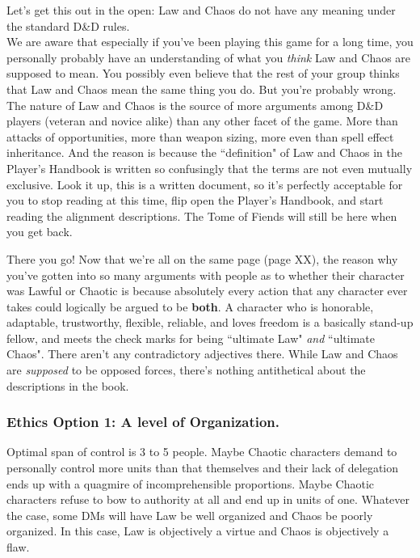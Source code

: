 Let's get this out in the open: Law and Chaos do not have any meaning under the standard D\&D rules.\\

We are aware that especially if you've been playing this game for a long time, you personally probably have an understanding of what you \textit{think} Law and Chaos are supposed to mean. You possibly even believe that the rest of your group thinks that Law and Chaos mean the same thing you do. But you're probably wrong. The nature of Law and Chaos is the source of more arguments among D\&D players (veteran and novice alike) than any other facet of the game. More than attacks of opportunities, more than weapon sizing, more even than spell effect inheritance. And the reason is because the ``definition" of Law and Chaos in the Player's Handbook is written so confusingly that the terms are not even mutually exclusive. Look it up, this is a written document, so it's perfectly acceptable for you to stop reading at this time, flip open the Player's Handbook, and start reading the alignment descriptions. The Tome of Fiends will still be here when you get back.

There you go! Now that we're all on the same page (page XX), the reason why you've gotten into so many arguments with people as to whether their character was Lawful or Chaotic is because absolutely every action that any character ever takes could logically be argued to be \textbf{both}. A character who is honorable, adaptable, trustworthy, flexible, reliable, and loves freedom is a basically stand-up fellow, and meets the check marks for being ``ultimate Law" \textit{and} ``ultimate Chaos". There aren't any contradictory adjectives there. While Law and Chaos are \textit{supposed} to be opposed forces, there's nothing antithetical about the descriptions in the book.


\subsubsection{Ethics Option 1: A level of Organization.}
Optimal span of control is 3 to 5 people. Maybe Chaotic characters demand to personally control more units than that themselves and their lack of delegation ends up with a quagmire of incomprehensible proportions. Maybe Chaotic characters refuse to bow to authority at all and end up in units of one. Whatever the case, some DMs will have Law be well organized and Chaos be poorly organized. In this case, Law is objectively a virtue and Chaos is objectively a flaw.

